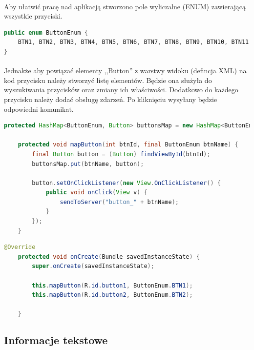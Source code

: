 \documentclass[12pt]{article}
\begin{document}
{{\paragraph{}
Aby ułatwić pracę nad aplikacją stworzono pole wyliczalne (ENUM) zawierającą wszystkie przyciski.

\begin{lstlisting}[language=Java]
public enum ButtonEnum {
    BTN1, BTN2, BTN3, BTN4, BTN5, BTN6, BTN7, BTN8, BTN9, BTN10, BTN11
}
\end{lstlisting}
\paragraph{}
Jednakże aby powiązać elementy ,,Button'' z warstwy widoku (defincja XML) na kod przycisku  należy stworzyć listę elementów. Będzie ona służyła do wyszukiwania przycisków oraz zmiany ich właściwości. Dodatkowo do każdego przycisku należy dodać obsługę zdarzeń. Po kliknięciu wysyłany będzie odpowiedni komunikat.

\begin{lstlisting}[language=Java]
    protected HashMap<ButtonEnum, Button> buttonsMap = new HashMap<ButtonEnum, Button>();

    protected void mapButton(int btnId, final ButtonEnum btnName) {
        final Button button = (Button) findViewById(btnId);
        buttonsMap.put(btnName, button);

        button.setOnClickListener(new View.OnClickListener() {
            public void onClick(View v) {
                sendToServer("button_" + btnName);
            }
        });
    }
\end{lstlisting}


\begin{lstlisting}[language=Java]
 @Override
    protected void onCreate(Bundle savedInstanceState) {
        super.onCreate(savedInstanceState);

        this.mapButton(R.id.button1, ButtonEnum.BTN1);
        this.mapButton(R.id.button2, ButtonEnum.BTN2);

    }
\end{lstlisting}

\subsection{Informacje tekstowe}
}}
\end{document}
